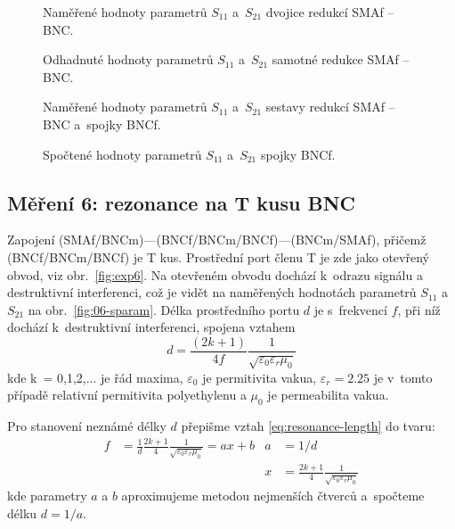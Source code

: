 \documentclass{protokol}
\newcommand\sparam{S}
\newcommand\female{f}
\newcommand\permitfree{\varepsilon_0}
\newcommand\permitrel{\varepsilon_r}
\newcommand\permeabfree{\mu_0}
\newcommand\connector[2]{#1 -- #2}
\begin{document}
\begin{figure}[p]
	\centering
	
	
	\caption{Naměřené hodnoty parametrů $\sparam_{11}$ a~$\sparam_{21}$
		dvojice redukcí \connector{SMA\female}{BNC}.}
	\label{fig:04-sparam}
\end{figure}

\begin{figure}[p]
	\centering
	
	
	\caption{Odhadnuté hodnoty parametrů $\sparam_{11}$ a~$\sparam_{21}$
		samotné redukce \connector{SMA\female}{BNC}.}
	\label{fig:04-result-sparam}
\end{figure}

\begin{figure}[p]
	\centering
	
	
	\caption{Naměřené hodnoty parametrů $\sparam_{11}$ a~$\sparam_{21}$
		sestavy redukcí \connector{SMA\female}{BNC} a~spojky BNC\female.}
	\label{fig:05-sparam}
\end{figure}

\begin{figure}[p]
	\centering
	
	
	\caption{Spočtené hodnoty parametrů $\sparam_{11}$ a~$\sparam_{21}$
		spojky BNC\female.}
	\label{fig:05-result-sparam}
\end{figure}

\clearpage
\subsection{Měření 6: rezonance na T kusu BNC}
\newcommand\freelen{d}
Zapojení (SMAf/BNCm)---(BNCf/BNCm/BNCf)---(BNCm/SMAf),
přičemž (BNCf/BNCm/BNCf) je T kus.
Prostřední port členu T je zde jako otevřený obvod, viz obr.~\ref{fig:exp6}.
Na otevřeném obvodu dochází k~odrazu signálu a destruktivní interferenci, což
je vidět na naměřených hodnotách parametrů $\sparam_{11}$ a~$\sparam_{21}$ na
obr.~\ref{fig:06-sparam}.
Délka prostředního portu $d$ je s~frekvencí $f$,
při níž dochází k~destruktivní interferenci, spojena vztahem
\begin{equation}
	d = \frac{(2k+1)}{4f} \frac{1}{\sqrt{\varepsilon_0 \varepsilon_r \mu_0}}
	\label{eq:resonance-length}
\end{equation}
kde k~= 0,1,2,... je řád maxima, $\varepsilon_0$ je permitivita vakua,
$\varepsilon_r = \num{2.25}$ je v~tomto případě relativní permitivita polyethylenu
a $\mu_0$ je permeabilita vakua.

Pro stanovení neznámé délky $\freelen$ přepišme vztah
\eqref{eq:resonance-length} do tvaru:
\begin{align}
	\label{eq:resonance-length-freq}
	f &= \frac{1}{\freelen} \frac{2k+1}{4}
		\frac{1}{\sqrt{\permitfree\permitrel\permeabfree}}
		= ax + b &
	a &= 1/\freelen \\
	& &
	x &= \frac{2k+1}{4}
		\frac{1}{\sqrt{\permitfree\permitrel\permeabfree}}
\end{align}
kde parametry $a$ a $b$ aproximujeme metodou nejmenších čtverců
a~spočteme délku $\freelen = 1/a$.
\end{document}
